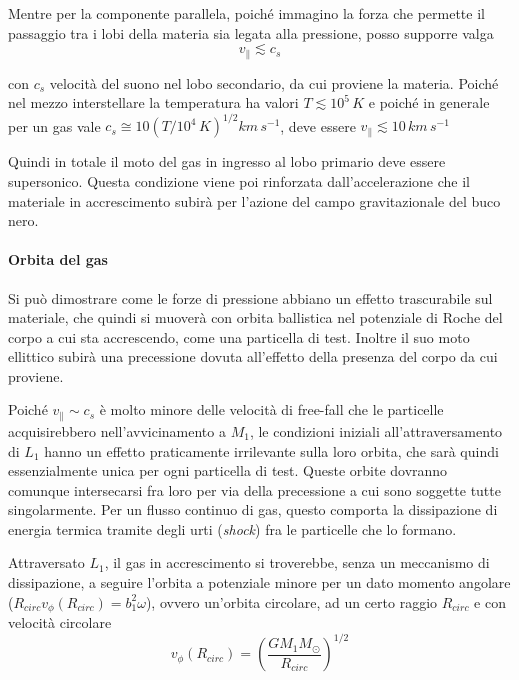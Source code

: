 \documentclass[a4paperbi]{article}
\begin{document}
	Mentre per la componente parallela, poiché immagino la forza che permette il passaggio tra i lobi della materia sia legata alla pressione, posso supporre valga
	\begin{equation}
		v_\parallel \lesssim c_{s}
	\end{equation}
	
	con $c_{s}$ velocità del suono nel lobo secondario, da cui proviene la materia. Poiché nel mezzo interstellare la temperatura ha valori $T\lesssim10^5\,K$ e poiché in generale per un gas vale $c_s\cong10(T/10^4\,K)^{1/2}km\,s^{-1}$, deve essere $v_\parallel\lesssim10\,km\,s^{-1}$
	
	Quindi in totale il moto del gas in ingresso al lobo primario deve essere supersonico. Questa condizione viene poi rinforzata dall'accelerazione che il materiale in accrescimento subirà per l'azione del campo gravitazionale del buco nero.

	\paragraph{Orbita del gas}	
	Si può dimostrare come le forze di pressione abbiano un effetto trascurabile sul materiale, che quindi si muoverà con orbita ballistica nel potenziale di Roche del corpo a cui sta accrescendo, come una particella di test. Inoltre il suo moto ellittico subirà una precessione dovuta all'effetto della presenza del corpo da cui proviene.
	
	Poiché $v_\parallel\sim c_s$ è molto minore delle velocità di free-fall che le particelle acquisirebbero nell'avvicinamento a $M_1$, le condizioni iniziali all'attraversamento di $L_1$ hanno un effetto praticamente irrilevante sulla loro orbita, che sarà quindi essenzialmente unica per ogni particella di test. Queste orbite dovranno comunque intersecarsi fra loro per via della precessione a cui sono soggette tutte singolarmente. Per un flusso continuo di gas, questo comporta la dissipazione di energia termica tramite degli urti (\textit{shock}) fra le particelle che lo formano. 
	
	Attraversato $L_1$, il gas in accrescimento si troverebbe, senza un meccanismo di dissipazione, a seguire l'orbita a potenziale minore per un dato momento angolare ($R_{circ}v_\phi(R_{circ})=b_1^2\omega$), ovvero un'orbita circolare, ad un certo raggio $R_{circ}$ e con velocità circolare
	\begin{equation}
		v_\phi(R_{circ})=\left(\frac{GM_1M_\odot}{R_{circ}}\right)^{1/2}
	\end{equation}
	
\end{document}
